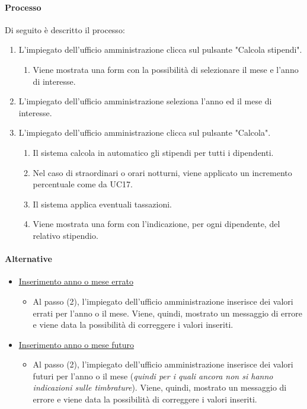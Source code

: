 \paragraph{Processo}
Di seguito è descritto il processo:
\begin{enumerate}
	\item L'impiegato dell'ufficio amministrazione clicca sul pulsante "Calcola stipendi".
		\begin{enumerate}
			\item Viene mostrata una form con la possibilità di selezionare il mese e l'anno di interesse.
		\end{enumerate}
	\item L'impiegato dell'ufficio amministrazione seleziona l'anno ed il mese di interesse.
	\item L'impiegato dell'ufficio amministrazione clicca sul pulsante "Calcola".
		\begin{enumerate}
			\item Il sistema calcola in automatico gli stipendi per tutti i dipendenti.
			\item Nel caso di straordinari o orari notturni, viene applicato un incremento percentuale come da UC17.
			\item Il sistema applica eventuali tassazioni.
			\item Viene mostrata una form con l'indicazione, per ogni dipendente, del relativo stipendio.
		\end{enumerate}
\end{enumerate}
\paragraph{Alternative}
\begin{itemize}
	\item \underline{Inserimento anno o mese errato}
		\begin{itemize}
			\item Al passo (2), l'impiegato dell'ufficio amministrazione inserisce dei valori errati per l'anno o il mese. Viene, quindi, mostrato un messaggio di errore e viene data la possibilità di correggere i valori inseriti.
		\end{itemize}
	\item \underline{Inserimento anno o mese futuro}
		\begin{itemize}
			\item Al passo (2), l'impiegato dell'ufficio amministrazione inserisce dei valori futuri per l'anno o il mese (\textit{quindi per i quali ancora non si hanno indicazioni sulle timbrature}). Viene, quindi, mostrato un messaggio di errore e viene data la possibilità di correggere i valori inseriti.
		\end{itemize}
\end{itemize}

